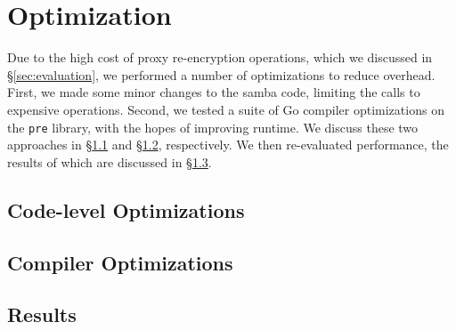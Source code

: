 \section{Optimization}
\label{sec:optimization}

Due to the high cost of proxy re-encryption operations, which we discussed in \S\ref{sec:evaluation}, we performed a number of optimizations to reduce overhead.
First, we made some minor changes to the samba code, limiting the calls to expensive operations.
Second, we tested a suite of Go compiler optimizations on the \texttt{pre} library, with the hopes of improving runtime.
We discuss these two approaches in \S\ref{sec:code-level-optimizations} and \S\ref{sec:compiler-optimizations}, respectively.
We then re-evaluated performance, the results of which are discussed in \S\ref{sec:optimization-results}.

\subsection{Code-level Optimizations}
\label{sec:code-level-optimizations}


\subsection{Compiler Optimizations}
\label{sec:compiler-optimizations}


\subsection{Results}
\label{sec:optimization-results}


